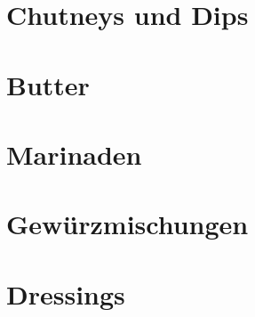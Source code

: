 \documentclass[DIV=11, pagesize, fontsize=11pt, paper=a4, numbers=noenddot]{scrartcl}
\begin{document}
\section{Chutneys und Dips}
\newpage{}
\newpage{}
\newpage{}

\section{Butter}
\newpage{}
\newpage{}
\newpage{}
\newpage{}
\newpage{}

\section{Marinaden}
\newpage{}
\newpage{}
\newpage{}

\section{Gewürzmischungen}
\newpage{}

\section{Dressings}
\newpage{}
\end{document}
